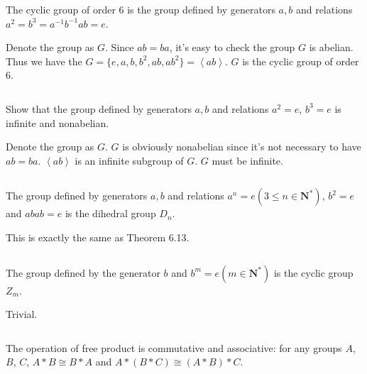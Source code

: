 $$ $$

\begin{ex}
    The cyclic group of order 6 is the group defined by generators $a, b$ and relations $a^{2}=b^{3}=a^{-1}b^{-1}ab=e$.
\end{ex}

\begin{answer}
    Denote the group as $G$. Since $ab=ba$, it's easy to check the group $G$ is abelian. Thus we have the $G=\{e, a, b, b^{2}, ab, ab^{2}\}=\left\langle ab\right\rangle$. $G$ is the cyclic group of order 6.
\end{answer}

$$ $$

\begin{ex}
    Show that the group defined by generators $a, b$ and relations $a^{2}=e$, $b^{3}=e$ is infinite and nonabelian.
\end{ex}

\begin{answer}
    Denote the group as $G$. $G$ is obviously nonabelian since it's not necessary to have $ab=ba$. $\left\langle ab\right\rangle$ is an infinite subgroup of $G$. $G$ must be infinite.
\end{answer}

$$ $$

\begin{ex}
    The group defined by generators $a, b$ and relations $a^{n}=e (3\leq n\in \mathbf{N}^{*})$, $b^{2}=e$ and $abab=e$ is the dihedral group $D_{n}$.
\end{ex}

\begin{answer}
    This is exactly the same as Theorem 6.13.
\end{answer}

$$ $$

\begin{ex}
    The group defined by the generator $b$ and $b^{m}=e(m\in \mathbf{N}^{*})$ is the cyclic group $Z_{m}$.
\end{ex}

\begin{answer}
    Trivial.
\end{answer}

$$ $$

\begin{ex}
    The operation of free product is commutative and associative: for any groups $A$, $B$, $C$, $A*B\cong B*A$ and $A*(B*C)\cong (A*B)*C$.
\end{ex}

